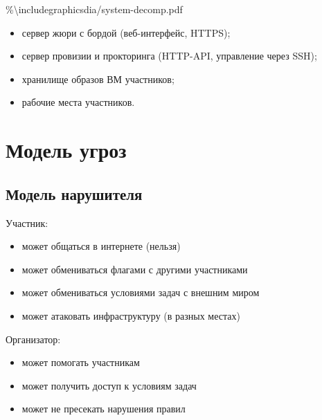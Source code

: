 \%\textbackslash includegraphics{dia/system-decomp.pdf}

\begin{itemize}
\item
  сервер жюри с бордой (веб-интерфейс, HTTPS);
\item
  сервер провизии и прокторинга (HTTP-API, управление через SSH);
\item
  хранилище образов ВМ участников;
\item
  рабочие места участников.
\end{itemize}

\section{Модель угроз}

\subsection{Модель нарушителя}

Участник:
\begin{itemize}
\item
  может общаться в интернете (нельзя)
\item
  может обмениваться флагами с другими участниками
\item
  может обмениваться условиями задач с внешним миром
\item
  может атаковать инфраструктуру (в разных местах)
\end{itemize}

Организатор:
\begin{itemize}
\item может помогать участникам
\item может получить доступ к условиям задач
\item может не пресекать нарушения правил
\end{itemize}
